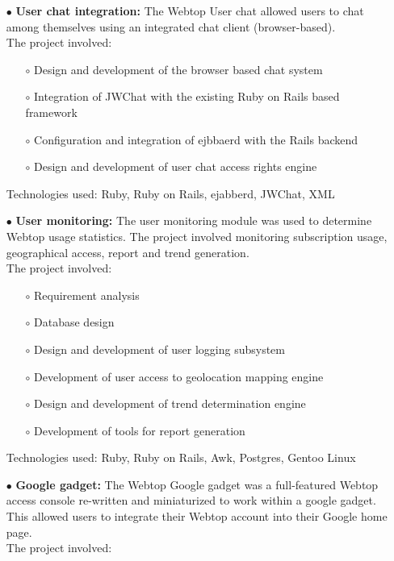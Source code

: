 \documentclass{scrartcl}
\begin{document}
\begin{cv}{
\href{http://www.develmj.com}{}
}
{\begin{itemize}
  \item[\footnotesize$\bullet$] \textbf{User chat integration: }The Webtop User chat allowed users to chat among
    themselves using an integrated chat client (browser-based).\\
    The project involved:
    \begin{itemize}
    \item[\footnotesize$\circ$] Design and development of the browser based chat system
    \item[\footnotesize$\circ$] Integration of JWChat with the existing Ruby on Rails based framework
    \item[\footnotesize$\circ$] Configuration and integration of ejbbaerd with the Rails backend
    \item[\footnotesize$\circ$] Design and development of user chat
      access rights engine
    \end{itemize}
    Technologies used: Ruby, Ruby on Rails, ejabberd, JWChat, XML
  \item[\footnotesize$\bullet$] \textbf{User monitoring: }The user monitoring module was used to determine
    Webtop usage statistics. The project involved monitoring subscription usage,
    geographical access, report and trend generation.\\
    The project involved:
    \begin{itemize}
    \item[\footnotesize$\circ$] Requirement analysis
    \item[\footnotesize$\circ$] Database design
    \item[\footnotesize$\circ$] Design and development of user logging subsystem
    \item[\footnotesize$\circ$] Development of user access to geolocation mapping engine
    \item[\footnotesize$\circ$] Design and development of trend determination engine
    \item[\footnotesize$\circ$] Development of tools for report
      generation
    \end{itemize}
    Technologies used: Ruby, Ruby on Rails, Awk, Postgres, Gentoo Linux
  \item[\footnotesize$\bullet$] \textbf{Google gadget: }The Webtop Google gadget was a full-featured Webtop
    access console re-written and miniaturized to work within a google gadget.
    This allowed users to integrate their Webtop account into their Google home
    page.\\
    The project involved:

\end{itemize}}
\end{cv}
\end{document}
